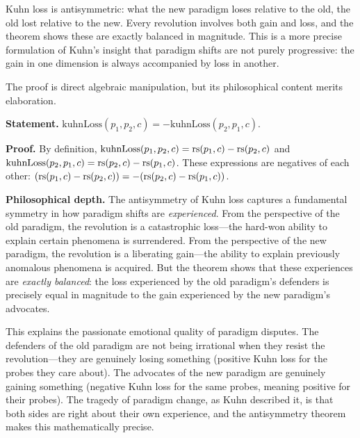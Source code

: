 \begin{interpretation}
Kuhn loss is antisymmetric: what the new paradigm loses relative to the old, the
old lost relative to the new. Every revolution involves both gain and loss, and
the theorem shows these are exactly balanced in magnitude. This is a more precise
formulation of Kuhn's insight that paradigm shifts are not purely progressive:
the gain in one dimension is always accompanied by loss in another.
\end{interpretation}

\begin{remark}
The proof is direct algebraic manipulation, but its philosophical content
merits elaboration.

\textbf{Statement.} $\mathrm{kuhnLoss}(p_1, p_2, c) = -\mathrm{kuhnLoss}(p_2, p_1, c)$.

\textbf{Proof.} By definition, $\mathrm{kuhnLoss}(p_1, p_2, c) = \mathrm{rs}(p_1, c) - \mathrm{rs}(p_2, c)$
and $\mathrm{kuhnLoss}(p_2, p_1, c) = \mathrm{rs}(p_2, c) - \mathrm{rs}(p_1, c)$. These
expressions are negatives of each other: $(\mathrm{rs}(p_1, c) - \mathrm{rs}(p_2, c)) =
-(\mathrm{rs}(p_2, c) - \mathrm{rs}(p_1, c))$.

\textbf{Philosophical depth.} The antisymmetry of Kuhn loss captures a
fundamental symmetry in how paradigm shifts are \emph{experienced}. From the
perspective of the old paradigm, the revolution is a catastrophic loss---the
hard-won ability to explain certain phenomena is surrendered. From the
perspective of the new paradigm, the revolution is a liberating gain---the
ability to explain previously anomalous phenomena is acquired. But the theorem
shows that these experiences are \emph{exactly balanced}: the loss experienced
by the old paradigm's defenders is precisely equal in magnitude to the gain
experienced by the new paradigm's advocates.

This explains the passionate emotional quality of paradigm disputes. The
defenders of the old paradigm are not being irrational when they resist the
revolution---they are genuinely losing something (positive Kuhn loss for
the probes they care about). The advocates of the new paradigm are genuinely
gaining something (negative Kuhn loss for the same probes, meaning positive
for their probes). The tragedy of paradigm change, as Kuhn described it, is
that both sides are right about their own experience, and the antisymmetry
theorem makes this mathematically precise.
\end{remark}


